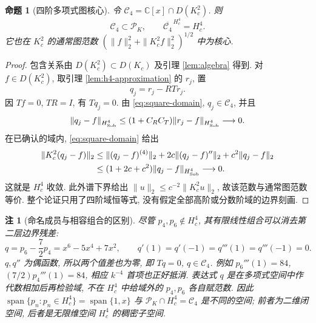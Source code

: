 \documentclass[UTF8]{ctexart}
\newtheorem{proposition}[theorem]{命题}
\newtheorem{remark}[theorem]{注}
\begin{document}
\begin{proposition}[四阶多项式图核心]\label{prop:h4-core}
令 $\mathcal C_4=\mathbb C[x]\cap D(K_c^2)$. 则
\[
 \mathcal C_4\subset\mathcal P_K,\qquad
 \overline{\mathcal C_4}^{\,H_c^4}=H_c^4.
\]
它也在 $K_c^2$ 的通常图范数
$(\|f\|_2^2+\|K_c^2f\|_2^2)^{1/2}$ 中为核心.
\end{proposition}
\begin{proof}
包含关系由 $D(K_c^2)\subset D(K_c)$ 及引理 \ref{lem:algebra} 得到.
对 $f\in D(K_c^2)$, 取引理 \ref{lem:h4-approximation} 的 $r_j$, 置
\[
 q_j=r_j-RT r_j.
\]
因 $Tf=0$, $TR=I$, 有 $Tq_j=0$. 由 \eqref{eq:square-domain},
$q_j\in\mathcal C_4$, 并且
\[
 \|q_j-f\|_{H^4_{\rm Sob}}
 \le(1+C_RC_T)\|r_j-f\|_{H^4_{\rm Sob}}\longrightarrow0.
\]
在已确认的域内, \eqref{eq:square-domain} 给出
\begin{align*}
 \|K_c^2(q_j-f)\|_2
 &\le \|(q_j-f)^{(4)}\|_2+2c\|(q_j-f)''\|_2+c^2\|q_j-f\|_2\\
 &\le(1+2c+c^2)\|q_j-f\|_{H^4_{\rm Sob}}\longrightarrow0.
\end{align*}
这就是 $H_c^4$ 收敛. 此外谱下界给出
$\|u\|_2\le c^{-2}\|K_c^2u\|_2$, 故该范数与通常图范数等价.
整个论证只用了四阶域恒等式, 没有假定全部高阶或分数阶域的边界刻画.
\end{proof}

\begin{remark}[命名成员与相容组合的区别]\label{rem:cancellation}
尽管 $p_4,p_6\notin H_c^4$, 其有限线性组合可以消去第二层边界残差:
\[
 q=p_6-\frac72p_4=x^6-5x^4+7x^2,\qquad
 q'(1)=q'(-1)=q'''(1)=q'''(-1)=0.
\]
$q,q''$ 为偶函数, 所以两个值差也为零, 即 $Tq=0$,
$q\in\mathcal C_4$. 例如 $p_6'''(1)=84$, $(7/2)p_4'''(1)=84$,
相应 $k^{-4}$ 首项也正好抵消.
表达式 $q$ 是在多项式空间中作代数相加后再检验域,
不在 $H_c^4$ 中给域外的 $p_4,p_6$ 各自赋范数.
因此 $\operatorname{span}\{p_n:p_n\in H_c^4\}=\operatorname{span}\{1,x\}$
与 $\mathcal P_K\cap H_c^4=\mathcal C_4$ 是不同的空间;
前者为二维闭空间, 后者是无限维空间 $H_c^4$ 的稠密子空间.
\end{remark}
\end{document}
